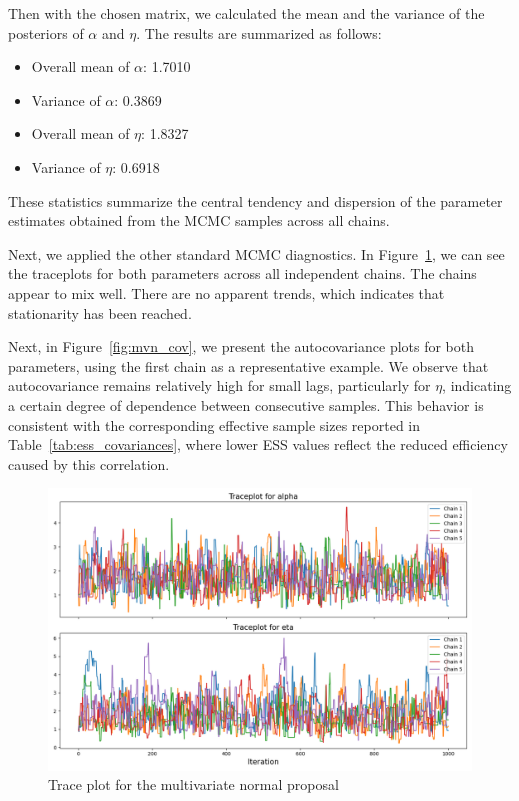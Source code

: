\documentclass[9pt]{IEEEtran}
\begin{document}
Then with the chosen matrix, we calculated the mean and the variance of
the posteriors of  $\alpha$ and $\eta$. The results are summarized as follows:

\begin{itemize}
  \item Overall mean of $\alpha$: 1.7010
  \item Variance of $\alpha$: 0.3869
  \item Overall mean of $\eta$: 1.8327
  \item Variance of $\eta$: 0.6918
\end{itemize}

These statistics summarize the central tendency and dispersion of the parameter estimates obtained from the MCMC samples across all chains.



Next, we applied the other standard MCMC diagnostics. In Figure~\ref{fig:mvn_trace}, 
we can see the traceplots for both parameters across all independent chains. The chains 
appear to mix well. There are no
  apparent trends, which indicates that stationarity has been reached.

Next, in Figure~\ref{fig:mvn_cov}, we present the autocovariance plots for both parameters, 
using the first chain as a representative example. We observe that autocovariance remains
 relatively high for small lags, particularly for \( \eta \), indicating a certain degree 
 of dependence between consecutive samples. This behavior is consistent with the corresponding
  effective sample sizes reported in Table~\ref{tab:ess_covariances}, where lower ESS values
   reflect the reduced efficiency caused by this correlation.



    \begin{figure}[h]
        \centering
        \includegraphics[width=0.99\columnwidth]{figures/mvn_trace.png}
        \caption{Trace plot for the multivariate normal proposal}
        \label{fig:mvn_trace}
    \end{figure}
\end{document}
